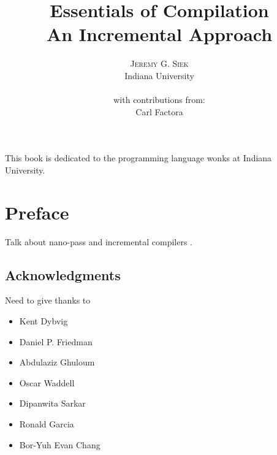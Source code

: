\documentclass[12pt]{book}
\title{\Huge \textbf{Essentials of Compilation} \\ 
  \huge An Incremental Approach}
\author{\textsc{Jeremy G. Siek} \\
  Indiana University \\
  \\
  with contributions from: \\
  Carl Factora
   }
\newenvironment{dedication}
{
   \cleardoublepage
   \thispagestyle{empty}
   \vspace*{\stretch{1}}
   \hfill\begin{minipage}[t]{0.66\textwidth}
   \raggedright
}
{
   \end{minipage}
   \vspace*{\stretch{3}}
   \clearpage
}
\begin{document}
\frontmatter
\maketitle

\begin{dedication}
This book is dedicated to the programming language wonks at Indiana
University.
\end{dedication}

\tableofcontents

\mainmatter

\chapter*{Preface}

Talk about nano-pass \citep{Sarkar:2004fk,Keep:2012aa} and incremental
compilers \citep{Ghuloum:2006bh}.



\section*{Acknowledgments}

Need to give thanks to 
\begin{itemize}
\item Kent Dybvig
\item Daniel P. Friedman
\item Abdulaziz Ghuloum
\item Oscar Waddell
\item Dipanwita Sarkar
\item Ronald Garcia
\item Bor-Yuh Evan Chang
\end{itemize}
\end{document}
